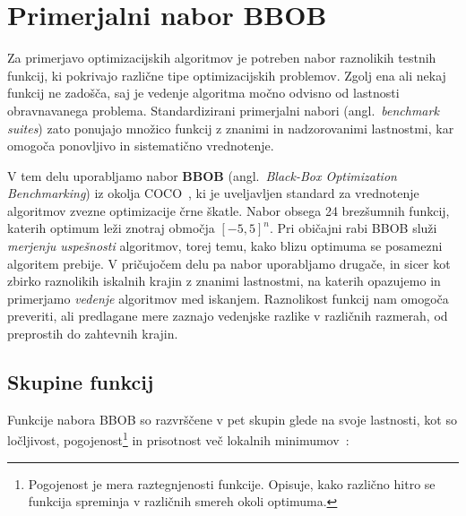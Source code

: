 \documentclass[a4paper, 12pt]{book}
\begin{document}
\section{Primerjalni nabor BBOB}
\label{sec:bbob}

Za primerjavo optimizacijskih algoritmov je potreben nabor raznolikih test\-nih
funkcij, ki pokrivajo različne tipe optimizacijskih problemov. Zgolj ena ali
nekaj funkcij ne zadošča, saj je vedenje algoritma močno odvisno od last\-no\-sti
obravnavanega problema. Standardizirani primerjalni nabori (angl.\ \emph{bench\-mark
suites}) zato ponujajo množico funkcij z znanimi in nadzorovanimi lastnostmi,
kar omogoča ponovljivo in sistematično vrednotenje.

V tem delu uporabljamo nabor \textbf{BBOB} (angl.\ \emph{Black-Box Optimization
Benchmarking}) iz okolja COCO~\cite{hansen2021coco}, ki je uveljavljen standard za
vrednotenje algoritmov zvezne optimizacije črne škatle. Nabor obsega 24
brezšumnih funkcij, katerih optimum leži znotraj območja $[-5, 5]^n$. Pri
običajni rabi BBOB služi \emph{merjenju uspešnosti} algoritmov, torej temu,
kako blizu optimuma se posamezni algoritem prebije. V pričujočem delu pa nabor
uporabljamo drugače, in sicer kot zbirko raznolikih iskalnih krajin z znanimi
lastnostmi, na katerih opazujemo in primerjamo \emph{vedenje} algoritmov med
iska\-njem. Raznolikost funkcij nam omogoča preveriti, ali predlagane mere
zaznajo vedenjske razlike v različnih razmerah, od preprostih do zahtevnih
krajin.

\subsection{Skupine funkcij}

Funkcije nabora BBOB so razvrščene v pet skupin glede na svoje lastnosti, kot
so ločljivost, pogojenost\footnote{Pogojenost je mera raztegnjenosti funkcije.
Opisuje, kako različno hitro se funkcija spreminja v različnih smereh okoli
optimuma.} in prisotnost več lokalnih minimumov~\cite{bbob2019}:
\end{document}
